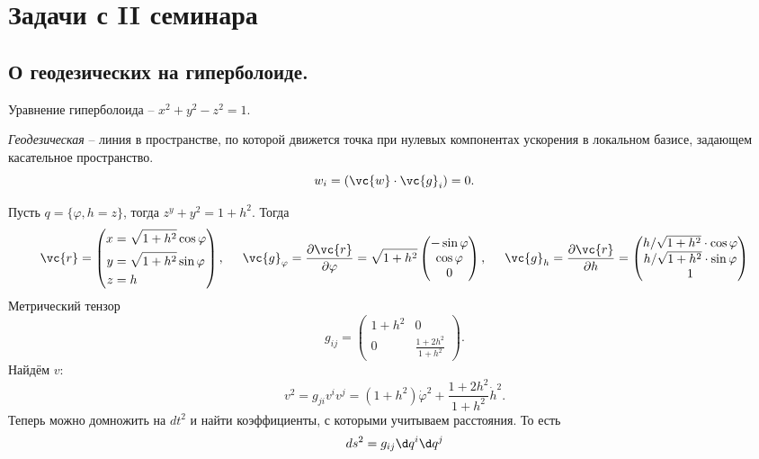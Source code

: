 \section{Задачи с II семинара}

\subsection*{О геодезических на гиперболоиде.}

Уравнение гиперболоида -- $x^2 + y^2 - z^2 = 1$.
\begin{to_def} 
    \textit{Геодезическая} -- линия в пространстве, по которой движется точка при нулевых компонентах ускорения в локальном базисе, задающем касательное пространство. 
    $$
        w_i = (\vc{w} \cdot \vc{g}_i) = 0.
    $$
\end{to_def}

Пусть $q = \{\varphi, h=z\}$, тогда $z^y + y^2 = 1 + h^2$. Тогда
$$
    \vc{r} = 
    \left(\begin{aligned}
        x &= \sqrt{1 + h^2} \cos \varphi\\
        y &= \sqrt{1+h^2} \sin \varphi \\
        z &= h
    \end{aligned}\right), \hspace{0.5cm} 
    \vc{g}_\varphi = \frac{\partial \vc{r}}{\partial \varphi} = \sqrt{1 + h^2}
    \begin{pmatrix}
        -\sin\varphi \\ \cos \varphi \\ 0
    \end{pmatrix}, \hspace{0.5cm} 
    \vc{g}_h = \frac{\partial \vc{r}}{\partial h} = \begin{pmatrix}
        h  / \sqrt{1 + h^2} \cdot  \cos\varphi \\
        h  / \sqrt{1 + h^2}  \cdot \sin\varphi \\
        1
    \end{pmatrix}
$$
Метрический тензор
$$
    g_{ij} = \begin{pmatrix}
        1 + h^2 & 0 \\
        0 & \frac{1+2h^2}{1+h^2} 
    \end{pmatrix}.
$$
Найдём $v$:
$$
    v^2 = g_{ji} v^i v^j = (1+h^2) \dot{\varphi}^2 + \frac{1+2h^2}{1+h^2} \dot{h}^2.
$$
Теперь можно домножить на $dt^2$ и найти коэффициенты, с которыми учитываем расстояния. То есть
\begin{equation}
    ds^2 = g_{ij} \d q^i \d q^j
\end{equation}


